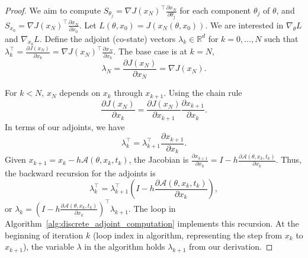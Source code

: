 \documentclass{article}
\newcommand{\Acal}{\mathcal{A}}
\newcommand{\R}{\mathbb{R}}
\begin{document}
\begin{proof}
We aim to compute $S_{\theta_j} = \nabla J(x_N)^\top \frac{\partial x_N}{\partial \theta_j}$ for each component $\theta_j$ of $\theta$, and $S_{x_0} = \nabla J(x_N)^\top \frac{\partial x_N}{\partial x_0}$.
Let $L(\theta, x_0) = J(x_N(\theta, x_0))$. We are interested in $\nabla_{\theta} L$ and $\nabla_{x_0} L$.
Define the adjoint (co-state) vectors $\lambda_k \in \R^d$ for $k=0, \dots, N$ such that $\lambda_k^\top = \frac{\partial J(x_N)}{\partial x_k} = \nabla J(x_N)^\top \frac{\partial x_N}{\partial x_k}$.
The base case is at $k=N$,
\begin{equation}
    \lambda_N = \frac{\partial J(x_N)}{\partial x_N} = \nabla J(x_N).
    \label{eq:pf_adjoint_init}
\end{equation}

For $k < N$, $x_N$ depends on $x_k$ through $x_{k+1}$. Using the chain rule
\[ \frac{\partial J(x_N)}{\partial x_k} = \frac{\partial J(x_N)}{\partial x_{k+1}} \frac{\partial x_{k+1}}{\partial x_k}. \]
In terms of our adjoints, we have
\[ \lambda_k^\top = \lambda_{k+1}^\top \frac{\partial x_{k+1}}{\partial x_k}. \]
Given $x_{k+1} = x_k - h\Acal(\theta, x_k, t_k)$, the Jacobian is $\frac{\partial x_{k+1}}{\partial x_k} = I - h \frac{\partial \Acal(\theta, x_k, t_k)}{\partial x_k}$.
Thus, the backward recursion for the adjoints is
\begin{equation}
    \lambda_k^\top = \lambda_{k+1}^\top \left(I - h \frac{\partial \Acal(\theta, x_k, t_k)}{\partial x_k}\right),
    \label{eq:pf_adjoint_recursion}
\end{equation}
or $\lambda_k = \left(I - h \frac{\partial \Acal(\theta, x_k, t_k)}{\partial x_k}\right)^\top \lambda_{k+1}$.
The loop in Algorithm~\ref{alg:discrete_adjoint_computation} implements this recursion. At the beginning of iteration $k$ (loop index in algorithm, representing the step from $x_k$ to $x_{k+1}$), the variable $\lambda$ in the algorithm holds $\lambda_{k+1}$ from our derivation.


\end{proof}
\end{document}
